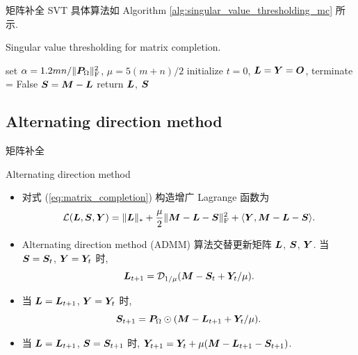 \documentclass{beamer}
\begin{document}
\begin{frame}{矩阵补全}
  SVT 具体算法如 Algorithm \ref{alg:singular_value_thresholding_mc} 所示.

    \begin{algorithm}[H]
      \small
      \label{alg:singular_value_thresholding_mc}
      \caption{Singular value thresholding for matrix completion.}
      set $\alpha=1.2mn/\|\bm{P}_\Omega\|_{\text{F}}^2$, $\mu=5(m+n)/2$\;
      initialize $t=0$, $\bm{L}=\bm{Y}=\bm{O}$, terminate = False\;
      $\bm{S}=\bm{M}-\bm{L}$\;
      return $\bm{L}$, $\bm{S}$\;
    \end{algorithm}
\end{frame}

\subsection{Alternating direction method}

\begin{frame}{矩阵补全}
  \begin{block}{Alternating direction method}
    \begin{itemize}
      \item 对式 (\ref{eq:matrix_completion}) 构造增广 Lagrange 函数为
      \begin{equation}
        \mathcal{L}(\bm{L},\bm{S},\bm{Y})=\|\bm{L}\|_{*}+\frac{\mu}{2}\|\bm{M}-\bm{L}-\bm{S}\|_{\text{F}}^2+\langle\bm{Y},\bm{M}-\bm{L}-\bm{S}\rangle.
      \end{equation}
      \item Alternating direction method (ADMM) \cite{lin2010augmented} 算法交替更新矩阵 $\bm{L}$, $\bm{S}$, $\bm{Y}$. 当 $\bm{S}=\bm{S}_{t}$, $\bm{Y}=\bm{Y}_t$ 时,
      \begin{equation}
        \bm{L}_{t+1}
        =\mathcal{D}_{1/\mu}(\bm{M}-\bm{S}_t+\bm{Y}_t/\mu).
      \end{equation}
      \item 当 $\bm{L}=\bm{L}_{t+1}$, $\bm{Y}=\bm{Y}_t$ 时,
      \begin{equation}
        \bm{S}_{t+1}
        =\bm{P}_\Omega\odot(\bm{M}-\bm{L}_{t+1}+\bm{Y}_t/\mu).
      \end{equation}
      \item 当 $\bm{L}=\bm{L}_{t+1}$, $\bm{S}=\bm{S}_{t+1}$ 时, $\bm{Y}_{t+1}=\bm{Y}_t+\mu(\bm{M}-\bm{L}_{t+1}-\bm{S}_{t+1})$.
    \end{itemize}
  \end{block}
\end{frame}
\end{document}
